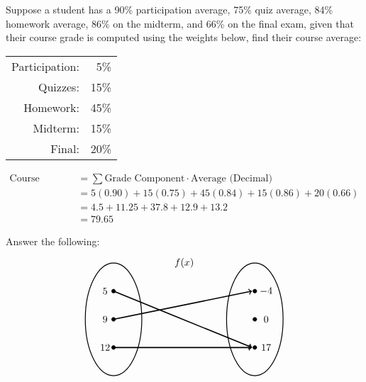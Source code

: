 \documentclass[12pt,letterpaper]{exam}
\begin{document}
\begin{questions}
\newpage



\question[8] Suppose a student has a 90\% participation average, 75\% quiz average, 84\% homework average, 86\% on the midterm, and 66\% on the final exam, given that their course grade is computed using the weights below, find their course average:
	\begin{table}[!ht]
	\centering
	\begin{tabular}{rr}
	Participation: & 5\% \\
	Quizzes: & 15\% \\
	Homework: & 45\% \\
	Midterm: & 15\% \\
	Final: & 20\%
	\end{tabular}
	\end{table} \pspace

	\[
	\begin{aligned}
	\text{Course Average}&= \sum \text{Grade Component} \cdot \text{Average (Decimal)} \\[0.3cm]
	&= 5 (0.90) + 15(0.75) + 45(0.84) + 15(0.86) + 20(0.66) \\[0.3cm]
	&= 4.5 + 11.25 + 37.8 + 12.9 + 13.2 \\[0.3cm]
	&= 79.65
	\end{aligned}
	\]



\newpage



\question[8] Answer the following:
	\[
	\begin{tikzpicture}
	\node at (2.5,2) {$f(x)$};
	\draw[line width=0.03cm] (0,0) circle (1 and 2);
	\draw[line width=0.03cm] (5,0) circle (1 and 2);
	
	\draw[fill=black] (0,1) circle (0.07);
	\draw[fill=black] (0,0) circle (0.07);
	\draw[fill=black] (0,-1) circle (0.07);
	
	\draw[fill=black] (5,1) circle (0.07);
	\draw[fill=black] (5,0) circle (0.07);
	\draw[fill=black] (5,-1) circle (0.07);
	
	\draw[line width=0.04cm,->] (0,1) -- (4.9,-1);
	\draw[line width=0.04cm,->] (0,0) -- (4.9,1);
	\draw[line width=0.04cm,->] (0,-1) -- (4.9,-1);
	
	\node at (-0.3,1) {$5$};
	\node at (-0.3,0) {$9$};
	\node at (-0.3,-1) {$12$};
	
	\node at (5.4,1) {$-4$};
	\node at (5.4,0) {$0$};
	\node at (5.4,-1) {$17$};
	\end{tikzpicture}
	\] \pspace


\end{questions}
\end{document}
